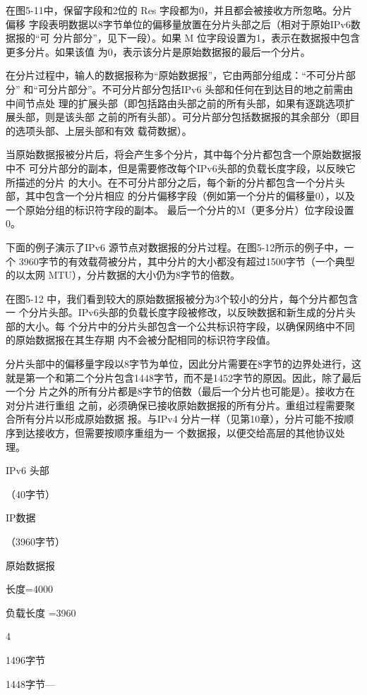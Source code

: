 在图5-11中，保留字段和2位的 Res 字段都为0，并且都会被接收方所忽略。分片偏移
字段表明数据以8字节单位的偏移量放置在分片头部之后（相对于原始IPv6数据报的“可
分片部分”，见下一段）。如果 M 位字段设置为1，表示在数据报中包含更多分片。如果该值
为0，表示该分片是原始数据报的最后一个分片。

在分片过程中，输人的数据报称为“原始数据报”，它由两部分组成：“不可分片部分”
和“可分片部分”。不可分片部分包括IPv6 头部和任何在到达目的地之前需由中间节点处
理的扩展头部（即包括路由头部之前的所有头部，如果有逐跳选项扩展头部，则是该头部
之前的所有头部）。可分片部分包括数据报的其余部分（即目的选项头部、上层头部和有效
载荷数据）。

当原始数据报被分片后，将会产生多个分片，其中每个分片都包含一个原始数据报中不
可分片部分的副本，但是需要修改每个IPv6头部的负载长度字段，以反映它所描述的分片
的大小。在不可分片部分之后，每个新的分片都包含一个分片头部，其中包含一个分片相应
的分片偏移字段（例如第一个分片的偏移量0），以及一个原始分组的标识符字段的副本。
最后一个分片的M（更多分片）位字段设置 0。

下面的例子演示了IPv6 源节点对数据报的分片过程。在图5-12所示的例子中，一个
3960字节的有效载荷被分片，其中分片的大小都没有超过1500字节（一个典型的以太网
MTU），分片数据的大小仍为8字节的倍数。

在图5-12 中，我们看到较大的原始数据报被分为3个较小的分片，每个分片都包含一
个分片头部。IPv6头部的负载长度字段被修改，以反映数据和新生成的分片头部的大小。每
个分片中的分片头部包含一个公共标识符字段，以确保网络中不同的原始数据报在其生存期
内不会被分配相同的标识符字段值。

分片头部中的偏移量字段以8字节为单位，因此分片需要在8字节的边界处进行，这
就是第一个和第二个分片包含1448字节，而不是1452字节的原因。因此，除了最后一个分
片之外的所有分片都是8字节的倍数（最后一个分片也可能是）。接收方在对分片进行重组
之前，必须确保已接收原始数据报的所有分片。重组过程需要聚合所有分片以形成原始数据
报。与IPv4 分片一样（见第10章），分片可能不按顺序到达接收方，但需要按顺序重组为一
个数据报，以便交给高层的其他协议处理。

IPv6 头部

（40字节）

IP数据

（3960字节）

原始数据报

长度=4000

负载长度 =3960

4

1496字节

1448字节—

